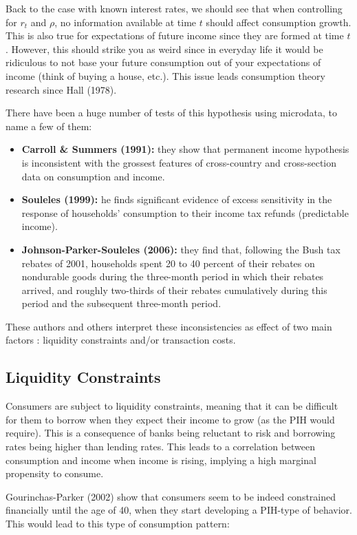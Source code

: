 \documentclass[12pt]{report}
\begin{document}
Back to the case with known interest rates, we should see that when controlling for $r_t$ and $\rho$, no information available at time $t$ should affect consumption growth. This is also true for expectations of future income since they are formed at time $t$. However, this should strike you as weird since in everyday life it would be ridiculous to not base your future consumption out of your expectations of income (think of buying a house, etc.). This issue leads consumption theory research since Hall (1978).

There have been a huge number of tests of this hypothesis using microdata, to name a few of them:\begin{itemize}
\item \textbf{Carroll \& Summers (1991):} they show that permanent income hypothesis is inconsistent with the grossest features of cross-country and cross-section data on consumption and income.
\item \textbf{Souleles (1999):} he finds significant evidence of excess  sensitivity  in  the  response  of  households’ consumption to their income tax refunds (predictable income).
\item \textbf{Johnson-Parker-Souleles (2006):} they find that, following the Bush tax rebates of 2001, households spent 20 to 40 percent of their rebates on nondurable goods during the three-month period in which their rebates arrived, and roughly two-thirds of their rebates cumulatively during this period and the subsequent three-month period.
\end{itemize}

These authors and others interpret these inconsistencies as effect of two main factors : liquidity constraints and/or transaction costs.

\subsection{Liquidity Constraints}

Consumers are subject to liquidity constraints, meaning that it can be difficult for them to borrow when they expect their income to grow (as the PIH would require). This is a consequence of banks being reluctant to risk and borrowing rates being higher than lending rates. This leads to a correlation between consumption and income when income is rising, implying a high marginal propensity to consume.

Gourinchas-Parker (2002) show that consumers seem to be indeed constrained financially until the age of 40, when they start developing a PIH-type of behavior. This would lead to this type of consumption pattern: 
\end{document}
